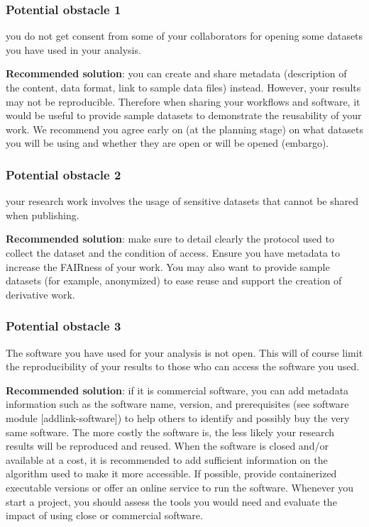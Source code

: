 \documentclass[
  letterpaper,
  DIV=11,
  numbers=noendperiod]{scrreport}
\begin{document}
\hypertarget{potential-obstacle-1}{%
\subsubsection{Potential obstacle 1}\label{potential-obstacle-1}}

you do not get consent from some of your collaborators for opening some
datasets you have used in your analysis.

\textbf{Recommended solution}: you can create and share metadata
(description of the content, data format, link to sample data files)
instead. However, your results may not be reproducible. Therefore when
sharing your workflows and software, it would be useful to provide
sample datasets to demonstrate the reusability of your work. We
recommend you agree early on (at the planning stage) on what datasets
you will be using and whether they are open or will be opened (embargo).

\hypertarget{potential-obstacle-2}{%
\subsubsection{Potential obstacle 2}\label{potential-obstacle-2}}

your research work involves the usage of sensitive datasets that cannot
be shared when publishing.

\textbf{Recommended solution}: make sure to detail clearly the protocol
used to collect the dataset and the condition of access. Ensure you have
metadata to increase the FAIRness of your work. You may also want to
provide sample datasets (for example, anonymized) to ease reuse and
support the creation of derivative work.

\hypertarget{potential-obstacle-3}{%
\subsubsection{Potential obstacle 3}\label{potential-obstacle-3}}

The software you have used for your analysis is not open. This will of
course limit the reproducibility of your results to those who can access
the software you used.

\textbf{Recommended solution}: if it is commercial software, you can add
metadata information such as the software name, version, and
prerequisites (see software module {[}addlink-software{]}) to help
others to identify and possibly buy the very same software. The more
costly the software is, the less likely your research results will be
reproduced and reused. When the software is closed and/or available at a
cost, it is recommended to add sufficient information on the algorithm
used to make it more accessible. If possible, provide containerized
executable versions or offer an online service to run the software.
Whenever you start a project, you should assess the tools you would need
and evaluate the impact of using close or commercial software.
\end{document}
